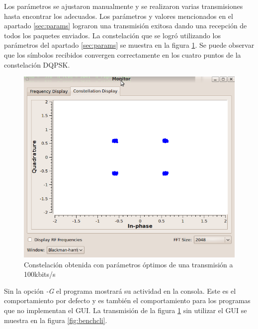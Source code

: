 Los par\'ametros se ajustaron manualmente y se realizaron varias transmisiones hasta encontrar
los adecuados. Los par\'ametros y valores mencionados en el apartado \ref{sec:params} lograron una transmisi\'on exitosa dando
una recepci\'on de todos los paquetes enviados. La constelaci\'on que se logr\'o utilizando los par\'ametros del apartado
\ref{sec:params} se muestra en la figura \ref{fig:firstgoodconst}. Se puede observar que los s\'imbolos recibidos
convergen correctamente en los cuatro puntos de la constelaci\'on DQPSK.

\begin{figure}[htp]
  \centering
  \includegraphics[width=5.5in]{figs/firstgoodconst}
  \vspace{0.3in}
  \caption{Constelaci\'on obtenida con par\'ametros \'optimos de una transmisi\'on a 100kbits/s}
  \label{fig:firstgoodconst}
\end{figure}

Sin la opci\'on \emph{-G} el programa mostrar\'a su actividad en la consola. Este es el
comportamiento por defecto y es tambi\'en el comportamiento para los programas que no implementan el
GUI. La transmisi\'on de la figura \ref{fig:firstgoodconst} sin utilizar el GUI se muestra en la
figura \ref{fig:benchcli}.

